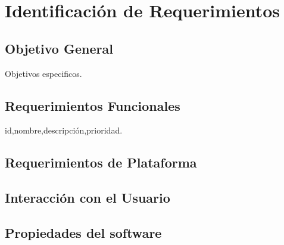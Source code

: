 \chapter{Identificación de Requerimientos}
\section{Objetivo General}
Objetivos especificos.
\section{Requerimientos Funcionales}
id,nombre,descripción,prioridad.
\section{Requerimientos de Plataforma}
\section{Interacción con el Usuario}
\section{Propiedades del software}
